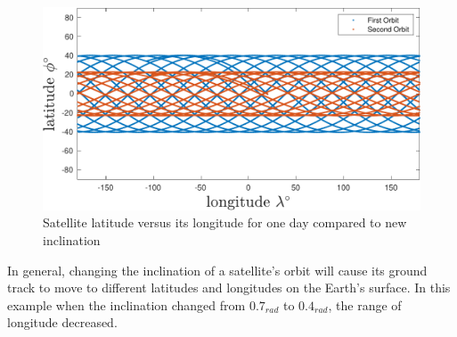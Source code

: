 \begin{figure}[H]
    \caption{Satellite latitude versus its longitude for one day compared to new inclination}
    \centering
    \includegraphics[width=16cm]{../Figure/Q2/latlong_compare}
\end{figure}
In general, changing the inclination of a satellite's orbit will cause its ground track to move to different latitudes and longitudes on the Earth's surface. In this example when the inclination changed from $0.7_{rad}$ to $0.4_{rad}$, the range of longitude decreased.